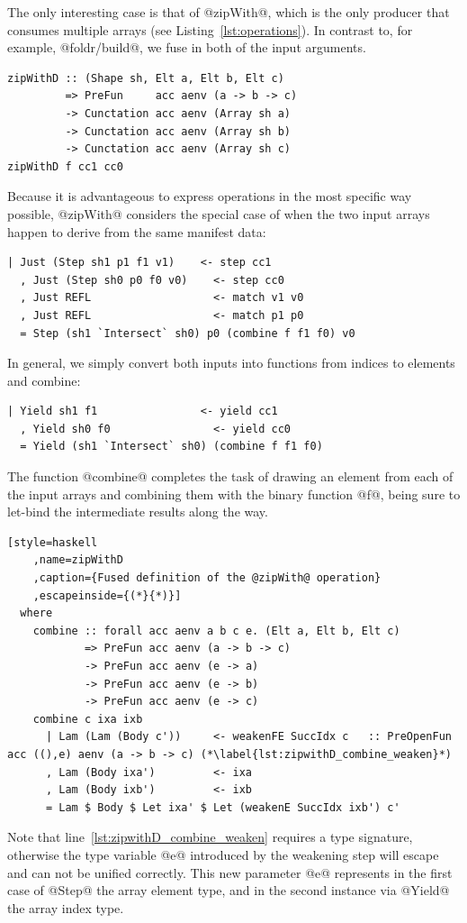 The only interesting case is that of @zipWith@, which is the only producer
that consumes multiple arrays (see Listing~\ref{lst:operations}). In contrast
to, for example, @foldr/build@, we fuse in both
of the input arguments.
%
\begin{lstlisting}[style=haskell
    ,name=zipWithD
    ,label=lst:zipWithD
    ,caption={[Fused definition of the @zipWith@ operation]}]
zipWithD :: (Shape sh, Elt a, Elt b, Elt c)
         => PreFun     acc aenv (a -> b -> c)
         -> Cunctation acc aenv (Array sh a)
         -> Cunctation acc aenv (Array sh b)
         -> Cunctation acc aenv (Array sh c)
zipWithD f cc1 cc0
\end{lstlisting}
%
Because it is advantageous to express operations in the most specific way
possible, @zipWith@ considers the special case of when the two input arrays
happen to derive from the same manifest data:
%
\begin{lstlisting}[style=haskell,name=zipWithD]
  | Just (Step sh1 p1 f1 v1)    <- step cc1
  , Just (Step sh0 p0 f0 v0)    <- step cc0
  , Just REFL                   <- match v1 v0
  , Just REFL                   <- match p1 p0
  = Step (sh1 `Intersect` sh0) p0 (combine f f1 f0) v0
\end{lstlisting}
%
In general, we simply convert both inputs into functions from indices to
elements and combine:
%
\begin{lstlisting}[style=haskell,name=zipWithD]
  | Yield sh1 f1                <- yield cc1
  , Yield sh0 f0                <- yield cc0
  = Yield (sh1 `Intersect` sh0) (combine f f1 f0)
\end{lstlisting}
%
The function @combine@ completes the task of drawing an element from each
of the input arrays and combining them with the binary function @f@, being
sure to let-bind the intermediate results along the way.
%
\begin{lstlisting}[style=haskell
    ,name=zipWithD
    ,caption={Fused definition of the @zipWith@ operation}
    ,escapeinside={(*}{*)}]
  where
    combine :: forall acc aenv a b c e. (Elt a, Elt b, Elt c)
            => PreFun acc aenv (a -> b -> c)
            -> PreFun acc aenv (e -> a)
            -> PreFun acc aenv (e -> b)
            -> PreFun acc aenv (e -> c)
    combine c ixa ixb
      | Lam (Lam (Body c'))     <- weakenFE SuccIdx c   :: PreOpenFun acc ((),e) aenv (a -> b -> c) (*\label{lst:zipwithD_combine_weaken}*)
      , Lam (Body ixa')         <- ixa
      , Lam (Body ixb')         <- ixb
      = Lam $ Body $ Let ixa' $ Let (weakenE SuccIdx ixb') c'
\end{lstlisting}
%
Note that line~\ref{lst:zipwithD_combine_weaken} requires a type signature,
otherwise the type variable @e@ introduced by the weakening step will
escape and can not be unified correctly. This new parameter @e@ represents
in the first case of @Step@ the array element type, and in the second
instance via @Yield@ the array index type.



